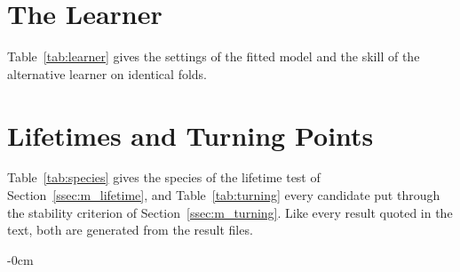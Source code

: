 \documentclass[sensors,article,submit,moreauthors,pdftex]{Definitions/mdpi}
\begin{document}
\section{The Learner}
\label{app:learner}
Table~\ref{tab:learner} gives the settings of the fitted model and the skill
of the alternative learner on identical folds.





\section{Lifetimes and Turning Points}
\label{app:tables}
Table~\ref{tab:species} gives the species of the lifetime test of
Section~\ref{ssec:m_lifetime}, and Table~\ref{tab:turning} every candidate put
through the stability criterion of Section~\ref{ssec:m_turning}. Like every
result quoted in the text, both are generated from the result files.



\begin{adjustwidth}{-\extralength}{0cm}

\providecommand{\PublishersNote}[1]{}
\PublishersNote{}
\end{adjustwidth}
\end{document}
